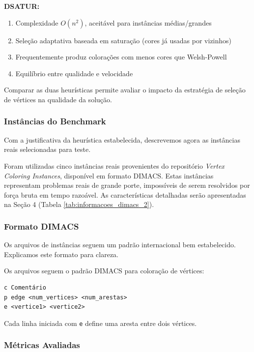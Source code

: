 \documentclass[12pt]{article}
\begin{document}
\textbf{DSATUR:}
\begin{enumerate}
    \item Complexidade $O(n^2)$, aceitável para instâncias médias/grandes
    \item Seleção adaptativa baseada em saturação (cores já usadas por vizinhos)
    \item Frequentemente produz colorações com menos cores que Welsh-Powell
    \item Equilíbrio entre qualidade e velocidade
\end{enumerate}

Comparar as duas heurísticas permite avaliar o impacto da estratégia de seleção de vértices na qualidade da solução.

\subsubsection{Instâncias do Benchmark}

Com a justificativa da heurística estabelecida, descrevemos agora as instâncias reais selecionadas para teste.

Foram utilizadas cinco instâncias reais provenientes do repositório \textit{Vertex Coloring Instances}, disponível em formato DIMACS. Estas instâncias representam problemas reais de grande porte, impossíveis de serem resolvidos por força bruta em tempo razoável. As características detalhadas serão apresentadas na Seção 4 (Tabela \ref{tab:informacoes_dimacs_2}).

\subsubsection{Formato DIMACS}

Os arquivos de instâncias seguem um padrão internacional bem estabelecido. Explicamos este formato para clareza.

Os arquivos seguem o padrão DIMACS para coloração de vértices:

\begin{verbatim}
c Comentário
p edge <num_vertices> <num_arestas>
e <vertice1> <vertice2>
\end{verbatim}

Cada linha iniciada com \texttt{e} define uma aresta entre dois vértices.

\subsubsection{Métricas Avaliadas}
\end{document}

